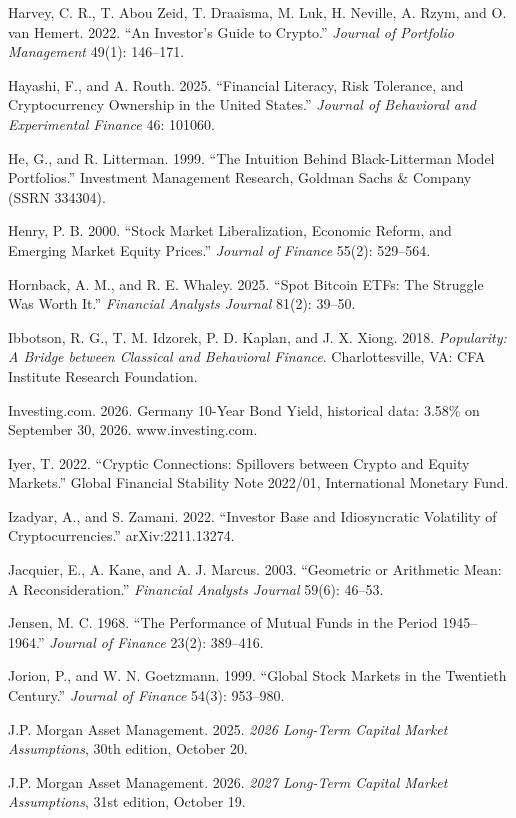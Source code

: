 \documentclass[11pt]{article}
\begin{document}
\begin{list}{}{\setlength{\itemindent}{-1.5em}\setlength{\leftmargin}{1.5em}\setlength{\itemsep}{2pt}\setlength{\parsep}{0pt}}
\item Harvey, C. R., T. Abou Zeid, T. Draaisma, M. Luk, H. Neville, A. Rzym, and O. van Hemert. 2022. ``An Investor's Guide to Crypto.'' \emph{Journal of Portfolio Management} 49(1): 146--171.
\item Hayashi, F., and A. Routh. 2025. ``Financial Literacy, Risk Tolerance, and Cryptocurrency Ownership in the United States.'' \emph{Journal of Behavioral and Experimental Finance} 46: 101060.
\item He, G., and R. Litterman. 1999. ``The Intuition Behind Black-Litterman Model Portfolios.'' Investment Management Research, Goldman Sachs \& Company (SSRN 334304).
\item Henry, P. B. 2000. ``Stock Market Liberalization, Economic Reform, and Emerging Market Equity Prices.'' \emph{Journal of Finance} 55(2): 529--564.
\item Hornback, A. M., and R. E. Whaley. 2025. ``Spot Bitcoin ETFs: The Struggle Was Worth It.'' \emph{Financial Analysts Journal} 81(2): 39--50.
\item Ibbotson, R. G., T. M. Idzorek, P. D. Kaplan, and J. X. Xiong. 2018. \emph{Popularity: A Bridge between Classical and Behavioral Finance}. Charlottesville, VA: CFA Institute Research Foundation.
\item Investing.com. 2026. Germany 10-Year Bond Yield, historical data: 3.58\% on September 30, 2026. www.investing.com.
\item Iyer, T. 2022. ``Cryptic Connections: Spillovers between Crypto and Equity Markets.'' Global Financial Stability Note 2022/01, International Monetary Fund.
\item Izadyar, A., and S. Zamani. 2022. ``Investor Base and Idiosyncratic Volatility of Cryptocurrencies.'' arXiv:2211.13274.
\item Jacquier, E., A. Kane, and A. J. Marcus. 2003. ``Geometric or Arithmetic Mean: A Reconsideration.'' \emph{Financial Analysts Journal} 59(6): 46--53.
\item Jensen, M. C. 1968. ``The Performance of Mutual Funds in the Period 1945--1964.'' \emph{Journal of Finance} 23(2): 389--416.
\item Jorion, P., and W. N. Goetzmann. 1999. ``Global Stock Markets in the Twentieth Century.'' \emph{Journal of Finance} 54(3): 953--980.
\item J.P. Morgan Asset Management. 2025. \emph{2026 Long-Term Capital Market Assumptions}, 30th edition, October 20.
\item J.P. Morgan Asset Management. 2026. \emph{2027 Long-Term Capital Market Assumptions}, 31st edition, October 19.

\end{list}
\end{document}
